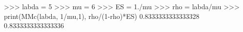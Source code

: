 
>>> labda = 5
>>> mu = 6
>>> ES = 1./mu
>>> rho = labda/mu
>>> print(MMc(labda, 1/mu,1), rho/(1-rho)*ES)
0.8333333333333328 0.8333333333333336

